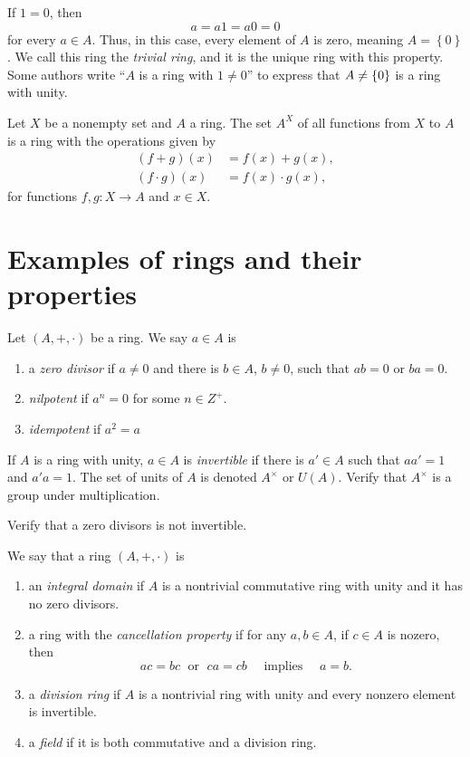 \documentclass[11pt,a4paper]{article}
\begin{document}
\begin{rem}
    If \(1 = 0\), then \[a = a 1 = a 0 = 0\] for every \(a\in A\).
    Thus, in this case, every element of \(A\) is zero, meaning \(A = \left\{ 0 \right\}\).
    We call this ring the \textit{trivial ring}, and it is the unique ring with this property.
    Some authors write ``$A$ is a ring with $1\neq 0$'' to express that $A\neq \left\lbrace 0 \right\rbrace$ is a ring with unity.
\end{rem}

\begin{exa}
Let \(X\) be a nonempty set and \(A\) a ring. 
The set \(A^X\) of all functions from \(X\) to  $A$ is  a ring with the operations given by
\begin{align*}
(f+g)(x) &= f(x)+g(x), \\
(f\cdot g)(x) &= f(x)\cdot g(x), 
\end{align*}
for functions \(f,g\colon X\to A\) and \(x\in X\). 
\end{exa}



\section{Examples of rings and their properties}

Let $(A,+,\cdot)$ be a ring. We say \(a\in A\) is 

\begin{enumerate}[label=(\roman*)]
\item a \textit{zero divisor} if \(a\neq 0\) and there is \(b \in A\), \(b\neq 0\), such that \(ab = 0\) or \(ba=0\).
\item \textit{nilpotent}  if \(a^n = 0\) for some \(n\in Z^+\).
\item \textit{idempotent} if \(a^2 = a\)
\end{enumerate}

If \(A\) is a ring with unity, \(a\in A\) is \textit{invertible} if there is \(a'\in A\) such that \(aa' = 1\) and \(a'a=1\).
The set of units of \(A\) is denoted \(A^\times \) or \(U(A)\). Verify that \(A^\times\) is a group under multiplication.

\begin{eje}
    Verify that a zero divisors is not invertible.
\end{eje}

We say that a ring $(A,+,\cdot)$
is 
\begin{enumerate}[label=(\roman*)]
\item an \textit{integral domain} if \(A\) is a nontrivial commutative ring with unity and it has no zero divisors.
\item a ring with the \textit{cancellation property} if for any \(a,b\in A\), if \(c\in A\) is nozero, then 
\[
ac=bc \;\text{ or }\; ca = cb \quad\text{ implies }\quad a=b.
\]

\item a \textit{division ring} if \(A\) is a nontrivial ring with unity and every nonzero element is invertible.
\item a \textit{field} if it is both commutative and   a division ring. 
\end{enumerate}
\end{document}
